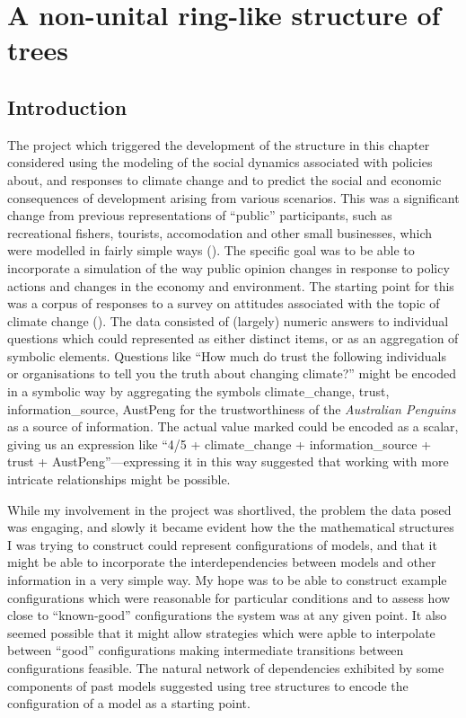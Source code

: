 \chapter[A RING-LIKE STRUCTURE OF TREES]{A non-unital ring-like structure of trees}\label{treering}
\section{Introduction}
The project which triggered the development of the structure in this
chapter considered using the modeling of the social dynamics
associated with policies about, and responses to climate change and to
predict the social and economic consequences of development arising
from various scenarios. This was a significant change from previous
representations of ``public'' participants, such as recreational
fishers, tourists, accomodation and other small businesses, which were
modelled in fairly simple ways (\cite{Fulton2011ningaloo,Gray2014}).
The specific goal was to be able to incorporate a simulation of the
way public opinion changes in response to policy actions and changes
in the economy and environment.  The starting point for this was a
corpus of responses to a survey on attitudes associated with the topic
of climate change (\cite{boschetti2012}). The data consisted of
(largely) numeric answers to individual questions which could
represented as either distinct items, or as an aggregation of symbolic
elements.  Questions like ``How much do trust the following
individuals or organisations to tell you the truth about changing
climate?'' might be encoded in a symbolic way by aggregating the
symbols \textsf{climate\_change, trust, information\_source, AustPeng}
for the trustworthiness of the \emph{Australian Penguins} as a source
of information. The actual value marked could be encoded as a scalar,
giving us an expression like ``\textsf{4/5 + climate\_change +
  information\_source + trust + AustPeng}''---expressing it in this
way suggested that working with more intricate relationships might be
possible.

While my involvement in the project was shortlived, the problem the
data posed was engaging, and slowly it became evident how the the
mathematical structures I was trying to construct could represent
configurations of models, and that it might be able to incorporate the
interdependencies between models and other information in a very
simple way.  My hope was to be able to construct example
configurations which were reasonable for particular conditions and to
assess how close to ``known-good'' configurations the system was at
any given point.  It also seemed possible that it might allow
strategies which were apble to interpolate between ``good''
configurations making intermediate transitions between configurations
feasible. The natural network of dependencies exhibited by some
components of past models suggested using tree structures to encode
the configuration of a model as a starting point.

